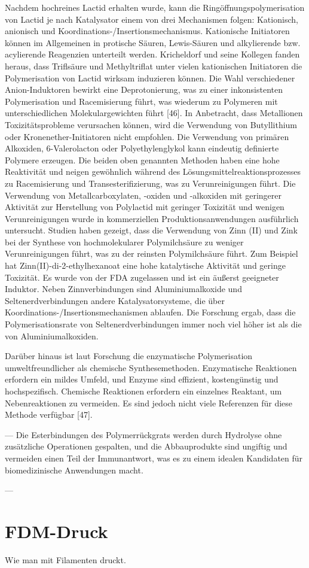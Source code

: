 \documentclass[10pt]{article}
\begin{document}
    Nachdem hochreines Lactid erhalten wurde, kann die Ringöffnungspolymerisation von Lactid je nach Katalysator einem von drei Mechanismen folgen: Kationisch, anionisch und Koordinations-/Insertionsmechanismus.
    Kationische Initiatoren können im Allgemeinen in protische Säuren, Lewis-Säuren und alkylierende bzw.
    acylierende Reagenzien unterteilt werden.
    Kricheldorf und seine Kollegen fanden heraus, dass Triflsäure und Methyltriflat unter vielen kationischen Initiatoren die Polymerisation von Lactid wirksam induzieren können.
    Die Wahl verschiedener Anion-Induktoren bewirkt eine Deprotonierung, was zu einer inkonsistenten Polymerisation und Racemisierung führt, was wiederum zu Polymeren mit unterschiedlichen Molekulargewichten führt [46].
    In Anbetracht, dass Metallionen Toxizitätsprobleme verursachen können, wird die Verwendung von Butyllithium oder Kronenether-Initiatoren nicht empfohlen.
    Die Verwendung von primären Alkoxiden, 6-Valerolacton oder Polyethylenglykol kann eindeutig definierte Polymere erzeugen.
    Die beiden oben genannten Methoden haben eine hohe Reaktivität und neigen gewöhnlich während des Lösungsmittelreaktionsprozesses zu Racemisierung und Transesterifizierung, was zu Verunreinigungen führt.
    Die Verwendung von Metallcarboxylaten, -oxiden und -alkoxiden mit geringerer Aktivität zur Herstellung von Polylactid mit geringer Toxizität und wenigen Verunreinigungen wurde in kommerziellen Produktionsanwendungen ausführlich untersucht.
    Studien haben gezeigt, dass die Verwendung von Zinn (II) und Zink bei der Synthese von hochmolekularer Polymilchsäure zu weniger Verunreinigungen führt, was zu der reinsten Polymilchsäure führt.
    Zum Beispiel hat Zinn(II)-di-2-ethylhexanoat eine hohe katalytische Aktivität und geringe Toxizität.
    Es wurde von der FDA zugelassen und ist ein äußerst geeigneter Induktor.
    Neben Zinnverbindungen sind Aluminiumalkoxide und Seltenerdverbindungen andere Katalysatorsysteme, die über Koordinations-/Insertionsmechanismen ablaufen.
    Die Forschung ergab, dass die Polymerisationsrate von Seltenerdverbindungen immer noch viel höher ist als die von Aluminiumalkoxiden.

    Darüber hinaus ist laut Forschung die enzymatische Polymerisation umweltfreundlicher als chemische Synthesemethoden.
    Enzymatische Reaktionen erfordern ein mildes Umfeld, und Enzyme sind effizient, kostengünstig und hochspezifisch.
    Chemische Reaktionen erfordern ein einzelnes Reaktant, um Nebenreaktionen zu vermeiden.
    Es sind jedoch nicht viele Referenzen für diese Methode verfügbar [47].


    ---
    Die Esterbindungen des Polymerrückgrats werden durch Hydrolyse ohne zusätzliche Operationen gespalten, und die Abbauprodukte sind ungiftig und vermeiden einen Teil der Immunantwort, was es zu einem idealen Kandidaten für biomedizinische Anwendungen macht.

    ---


    \section{FDM-Druck}
    Wie man mit Filamenten druckt.
\end{document}
